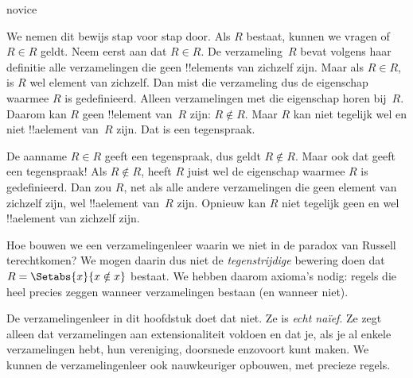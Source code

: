 \documentclass[../../../include/open-logic-section]{subfiles}
\begin{document}
\begin{tagblock}{novice}
\begin{explain}
We nemen dit bewijs stap voor stap door. Als $R$ bestaat, kunnen we
vragen of $R \in R$ geldt. Neem eerst aan dat $R \in R$. De
verzameling~$R$ bevat volgens haar definitie alle verzamelingen die
geen !!{element}s van zichzelf zijn. Maar als $R \in R$, is $R$ wel
element van zichzelf. Dan mist die verzameling dus de eigenschap waarmee $R$
is gedefinieerd. Alleen verzamelingen met die eigenschap horen
bij~$R$. Daarom kan $R$ geen !!{element} van~$R$ zijn: $R \notin R$.
Maar $R$ kan niet tegelijk wel en niet !!a{element} van~$R$ zijn.
Dat is een tegenspraak.

De aanname $R \in R$ geeft een tegenspraak, dus geldt $R \notin R$.
Maar ook dat geeft een tegenspraak!{} Als $R \notin R$, heeft $R$
juist wel de eigenschap waarmee $R$ is gedefinieerd. Dan zou $R$, net
als alle andere verzamelingen die geen element van zichzelf zijn, wel
!!a{element} van~$R$ zijn. Opnieuw kan $R$ niet tegelijk geen en wel
!!a{element} van zichzelf zijn.
\end{explain}
\end{tagblock}

\begin{digress}
Hoe bouwen we een verzamelingenleer waarin we niet in de paradox van
Russell terechtkomen? We mogen daarin dus niet de
\emph{tegenstrijdige} bewering doen dat $R = \Setabs{x}{x \notin x}$
bestaat. We hebben daarom axioma's nodig: regels die heel precies
zeggen wanneer verzamelingen bestaan (en wanneer niet).
	
De verzamelingenleer in dit hoofdstuk doet dat niet. Ze is
\emph{echt na\"ief}. Ze zegt alleen dat verzamelingen aan
extensionaliteit voldoen en dat je, als je al enkele verzamelingen
hebt, hun vereniging, doorsnede enzovoort kunt maken. We kunnen de
verzamelingenleer ook nauwkeuriger opbouwen, met precieze regels.
\end{digress}
\end{document}

